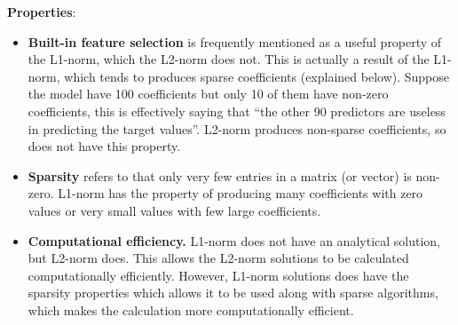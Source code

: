 \bigbreak
\textbf{Properties}:
\begin{itemize}
\item{\textbf{Built-in feature selection}} is frequently mentioned as a useful property of the L1-norm, which the L2-norm does not. This is actually a result of the L1-norm, which tends to produces sparse coefficients (explained below). Suppose the model have 100 coefficients but only 10 of them have non-zero coefficients, this is effectively saying that “the other 90 predictors are useless in predicting the target values”. L2-norm produces non-sparse coefficients, so does not have this property.
\item{\textbf{Sparsity}} refers to that only very few entries in a matrix (or vector) is non-zero. L1-norm has the property of producing many coefficients with zero values or very small values with few large coefficients.
\item{\textbf{Computational efficiency.}} L1-norm does not have an analytical solution, but L2-norm does. This allows the L2-norm solutions to be calculated computationally efficiently. However, L1-norm solutions does have the sparsity properties which allows it to be used along with sparse algorithms, which makes the calculation more computationally efficient.
\end{itemize}
